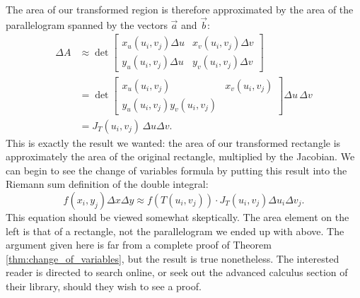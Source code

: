 The area of our transformed region is therefore approximated by the area of the parallelogram spanned by the vectors $\vec{a}$ and $\vec{b}$:
\begin{align*}
\Delta A &\approx \det\begin{bmatrix} x_u(u_i,v_j)\Delta u & x_v(u_i,v_j)\Delta v\\y_u(u_i,v_j)\Delta u & y_v(u_i,v_j)\Delta v\end{bmatrix}\\
& = \det\begin{bmatrix} x_u(u_i,v_j) & x_v(u_i,v_j)\\y_u(u_i,v_j) y_v(u_i,v_j) \end{bmatrix}\Delta u\,\Delta v\\
& = J_T(u_i,v_j)\,\Delta u\Delta v.
\end{align*}
This is exactly the result we wanted: the area of our transformed rectangle is approximately the area of the original rectangle, multiplied by the Jacobian. We can begin to see the change of variables formula by putting this result into the Riemann sum definition of the double integral:
\[
f(x_i,y_j)\Delta x\Delta y \approx f(T(u_i,v_j))\cdot J_T(u_i,v_j)\Delta u_i\Delta v_j.
\]
This equation should be viewed somewhat skeptically. The area element on the left is that of a rectangle, not the parallelogram we ended up with above. The argument given here is far from a complete proof of Theorem \ref{thm:change_of_variables}, but the result is true nonetheless. The interested reader is directed to search online, or seek out the advanced calculus section of their library, should they wish to see a proof.


